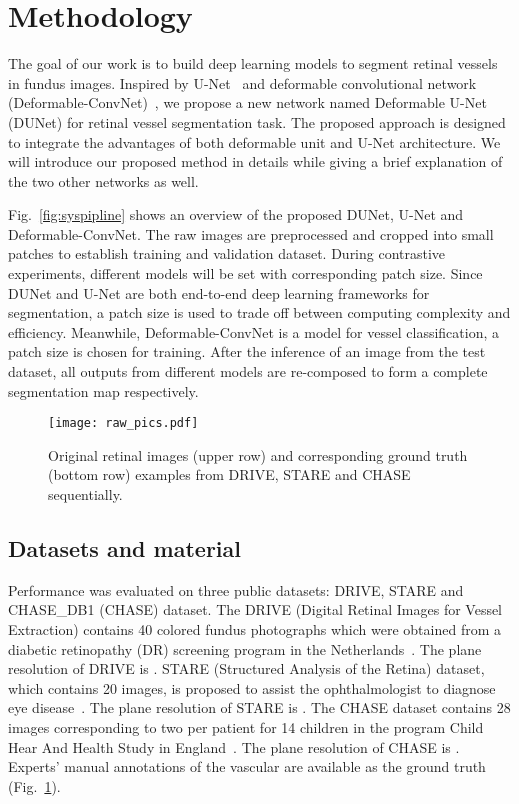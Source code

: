 \documentclass[journal]{IEEEtran}
\begin{document}
\section{Methodology}
\label{sec:method}
The goal of our work is to build deep learning models to segment retinal vessels in fundus images. Inspired by U-Net~\cite{ronneberger_u-net:_2015} and deformable convolutional network (Deformable-ConvNet)~\cite{dai_deformable_2017}, we propose a new network named Deformable U-Net (DUNet) for retinal vessel segmentation task. The proposed approach is designed to integrate the advantages of both deformable unit and U-Net architecture. We will introduce our proposed method in details while giving a brief explanation of the two other networks as well.


Fig.~\ref{fig:syspipline} shows an overview of the proposed DUNet, U-Net and Deformable-ConvNet. The raw images are preprocessed and cropped into small patches to establish training and validation dataset. During contrastive experiments, different models will be set with corresponding patch size. Since DUNet and U-Net are both end-to-end deep learning frameworks for segmentation, a  patch size is used to trade off between computing complexity and efficiency. Meanwhile, Deformable-ConvNet is a model for vessel classification, a  patch size is chosen for training. After the inference of an image from the test dataset, all outputs from different models are re-composed to form a complete segmentation map respectively.

\begin{figure}
\centering
\texttt{[image: raw\_pics.pdf]}
\caption{Original retinal images (upper row) and corresponding ground truth (bottom row) examples from DRIVE, STARE and CHASE sequentially.}
\label{fig:raw_pics}
\end{figure}

\subsection{Datasets and material}
Performance was evaluated on three public datasets: DRIVE, STARE and CHASE\_DB1 (CHASE) dataset. The DRIVE (Digital Retinal Images for Vessel Extraction) contains 40 colored fundus photographs which were obtained from a diabetic retinopathy (DR) screening program in the Netherlands~\cite{Staal2004Ridge}. The plane resolution of DRIVE is . STARE (Structured Analysis of the Retina) dataset, which contains 20 images, is proposed to assist the ophthalmologist to diagnose eye disease~\cite{hoover_locating_1998}. The plane resolution of STARE is . The CHASE dataset contains 28 images corresponding to two per patient for 14 children in the program Child Hear And Health Study in England~\cite{Owen2009Measuring}. The plane resolution of CHASE is . Experts' manual annotations of the vascular are available as the ground truth (Fig.~\ref{fig:raw_pics}).
\end{document}
